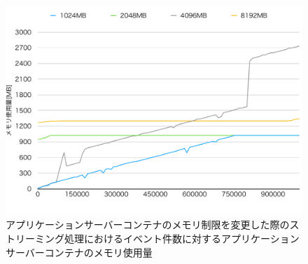\documentclass[../../../../../main]{subfiles}
\begin{document}
    \begin{figure}[H]
        \centering
        \includegraphics[width=12cm]{graph}
        \caption{アプリケーションサーバーコンテナのメモリ制限を変更した際のストリーミング処理におけるイベント件数に対するアプリケーションサーバーコンテナのメモリ使用量}
        \label{fig:stream-change-app-memory-limit-app-memory-app_4_db_1_1024}
    \end{figure}
\end{document}
